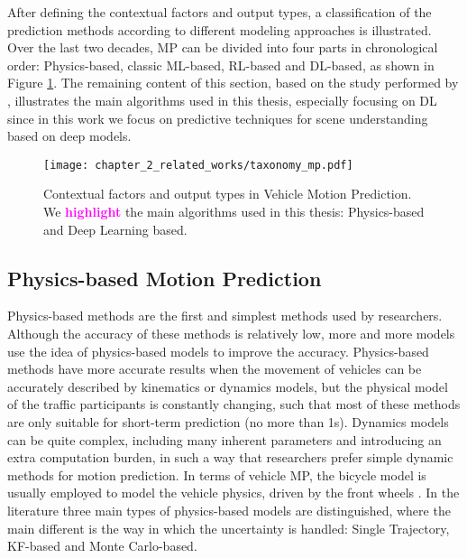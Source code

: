 After defining the contextual factors and output types, a classification of the prediction methods according to different modeling approaches is illustrated. Over the last two decades, \ac{MP} can be divided into four parts in chronological order: Physics-based, classic \ac{ML}-based, \ac{RL}-based and \ac{DL}-based, as shown in Figure \ref{fig:chapter_2_related_works/taxonomy_mp}. The remaining content of this section, based on the study performed by \cite{huang2022survey}, illustrates the main algorithms used in this thesis, especially focusing on \ac{DL} since in this work we focus on predictive techniques for scene understanding based on deep models.

\begin{figure}[h]
	\centering
	\texttt{[image: chapter\_2\_related\_works/taxonomy\_mp.pdf]}
	\caption[Contextual factors and output types in Vehicle Motion Prediction]{Contextual factors and output types in Vehicle Motion Prediction. We \textbf{\textcolor{magenta}{highlight}} the main algorithms used in this thesis: Physics-based and Deep Learning based.}
	\label{fig:chapter_2_related_works/taxonomy_mp}
\end{figure}

\subsection{Physics-based Motion Prediction}
\label{subsec:2_physics_based_mp}

Physics-based methods are the first and simplest methods used by researchers. Although the accuracy of these methods is relatively low, more and more models use the idea of physics-based models to improve the accuracy. Physics-based methods have more accurate results when the movement of vehicles can be accurately described by kinematics or dynamics models, but the physical model of the traffic participants is constantly changing, such that most of these methods are only suitable for short-term prediction (no more than 1s). Dynamics models can be quite complex, including many inherent parameters and introducing an extra computation burden, in such a way that researchers prefer simple dynamic methods for motion prediction. In terms of vehicle \ac{MP}, the bicycle model is usually employed to model the vehicle physics, driven by the front wheels \cite{kaempchen2009situation, pepy2006reducing}. In the literature three main types of physics-based models are distinguished, where the main different is the way in which the uncertainty is handled: Single Trajectory, \ac{KF}-based and Monte Carlo-based.

